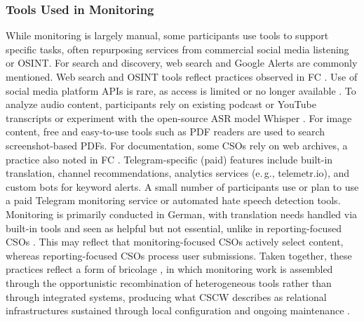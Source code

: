 \documentclass[acmsmall]{acmart}
\begin{document}
\subsubsection{Tools Used in Monitoring}
While monitoring is largely manual, some participants use tools to support specific tasks, often repurposing services from commercial social media listening or OSINT. For search and discovery, web search and Google Alerts are commonly mentioned. Web search and OSINT tools reflect practices observed in FC \cite{nordis_report_2022}. Use of social media platform APIs is rare, as access is limited or no longer available \cite{ortutay_meta_2024}.
To analyze audio content, participants rely on existing podcast or YouTube transcripts or experiment with the open-source ASR model Whisper \cite{open_ai_introducing_2022}. For image content, free and easy-to-use tools such as PDF readers are used to search screenshot-based PDFs. For documentation, some CSOs rely on web archives, a practice also noted in FC \cite{mckeown_investigating_2014,nordis_policy_2022}.
Telegram-specific (paid) features include built-in translation, channel recommendations, analytics services (e.\,g., telemetr.io), and custom bots for keyword alerts. A small number of participants use or plan to use a paid Telegram monitoring service or automated hate speech detection tools. Monitoring is primarily conducted in German, with translation needs handled via built-in tools and seen as helpful but not essential, unlike in reporting-focused CSOs \cite{baumler_harnessing_2025}. This may reflect that monitoring-focused CSOs actively select content, whereas reporting-focused CSOs process user submissions.
Taken together, these practices reflect a form of bricolage \cite{buscher_landscapes_2001,karanasios_digital_2022}, in which monitoring work is assembled through the opportunistic recombination of heterogeneous tools rather than through integrated systems, producing what CSCW describes as relational infrastructures sustained through local configuration and ongoing maintenance \cite{star_steps_1994}.
\end{document}
